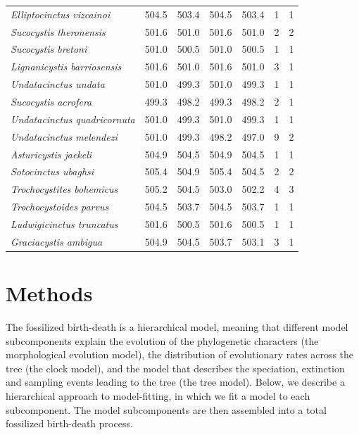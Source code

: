 \documentclass{article}
\begin{document}
\begin{table}[]
\begin{tabular}{l|llllll}
\textit{Elliptocinctus vizcainoi}    & 504.5 & 503.4 & 504.5 & 503.4 & 1  & 1  \\
\textit{Sucocystis theronensis}      & 501.6 & 501.0 & 501.6 & 501.0 & 2  & 2  \\
\rowcolor[HTML]{C0C0C0} 
\textit{Sucocystis bretoni}          & 501.0 & 500.5 & 501.0 & 500.5 & 1  & 1  \\
\textit{Lignanicystis barriosensis}  & 501.6 & 501.0 & 501.6 & 501.0 & 3  & 1  \\
\rowcolor[HTML]{C0C0C0} 
\textit{Undatacinctus undata}        & 501.0 & 499.3 & 501.0 & 499.3 & 1  & 1  \\
\textit{Sucocystis acrofera}         & 499.3 & 498.2 & 499.3 & 498.2 & 2  & 1  \\
\rowcolor[HTML]{C0C0C0} 
\textit{Undatacinctus quadricornuta} & 501.0 & 499.3 & 501.0 & 499.3 & 1  & 1  \\
\textit{Undatacinctus melendezi}     & 501.0 & 499.3 & 498.2 & 497.0 & 9  & 2  \\
\rowcolor[HTML]{C0C0C0} 
\textit{Asturicystis jaekeli}        & 504.9 & 504.5 & 504.9 & 504.5 & 1  & 1  \\
\textit{Sotocinctus ubaghsi}         & 505.4 & 504.9 & 505.4 & 504.5 & 2  & 2  \\
\rowcolor[HTML]{C0C0C0} 
\textit{Trochocystites bohemicus}    & 505.2 & 504.5 & 503.0 & 502.2 & 4  & 3  \\
\textit{Trochocystoides parvus}      & 504.5 & 503.7 & 504.5 & 503.7 & 1  & 1  \\
\rowcolor[HTML]{C0C0C0} 
\textit{Ludwigicinctus truncatus}    & 501.6 & 500.5 & 501.6 & 500.5 & 1  & 1  \\
\textit{Graciacystis ambigua}        & 504.9 & 504.5 & 503.7 & 503.1 & 3  & 1 
\end{tabular}
\end{table}


\section{Methods}

The fossilized birth-death is a hierarchical model, meaning that different model subcomponents explain the evolution of the phylogenetic characters (the morphological evolution model), the distribution of evolutionary rates across the tree (the clock model), and the model that describes the speciation, extinction and sampling events leading to the tree (the tree model). 
Below, we describe a hierarchical approach to model-fitting, in which we fit a model to each subcomponent.
The model subcomponents are then assembled into a total fossilized birth-death process.
\end{document}
